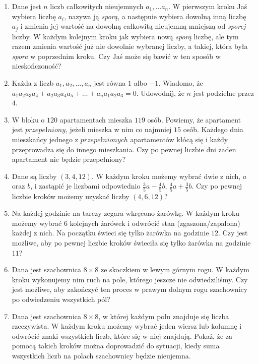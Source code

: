 \documentclass{article}
\begin{document}
\begin{enumerate}[\Roman*.]
\begin{enumerate}[1.]
				\item Dane jest $n$ liczb całkowitych nieujemnych $a_1, \ldots a_n$. W pierwszym kroku Jaś wybiera liczbę $a_i$, nazywa ją \textit{sporą}, a następnie wybiera dowolną inną liczbę $a_j$ i zmienia jej wartość na dowolną całkowitą nieujemną mniejszą od \textit{sporej} liczby. W każdym kolejnym kroku jak wybiera nową \textit{sporą} liczbę, ale tym razem zmienia wartość już nie dowolnie wybranej liczby, a takiej, która była \textit{spora} w poprzednim kroku. Czy Jaś może się bawić w ten sposób w nieskończoność?
					
				\item Każda z liczb $a_1, a_2, \ldots , a_n$ jest równa $1$ albo $-1$. Wiadomo, że $a_1 a_2 a_3 a_4 + a_2 a_3 a_4 a_5 + \ldots + a_n a_1 a_2 a_3 = 0$. Udowodnij, że $n$ jest podzielne przez $4$.
				
				\item W bloku o $120$ apartamentach mieszka $119$ osób. Powiemy, że apartament jest $przepełniony$, jeżeli mieszka w nim co najmniej $15$ osób. Każdego dnia mieszkańcy jednego z $przepełnionych$ apartamentów kłócą się i każdy przeprowadza się do innego mieszkania. Czy po pewnej liczbie dni żaden apartament nie będzie przepełniony?
				
				\item Dane są liczby $(3, 4, 12)$. W każdym kroku możemy wybrać dwie z nich, $a$ oraz $b$, i zastąpić je liczbami odpowiednio $\frac{3}{5}a - \frac{4}{5}b$, $\frac{4}{5}a + \frac{3}{5}b$. Czy po pewnej liczbie kroków możemy uzyskać liczby $(4, 6, 12)$?
					
				\item Na każdej godzinie na tarczy zegara wkręcono żarówkę. W każdym kroku możemy wybrać $6$ kolejnych żarówek i odwrócić stan (zgaszona/zapalona) każdej z nich. Na początku świeci się tylko żarówka na godzinie $12$. Czy jest możliwe, aby po pewnej liczbie kroków świeciła się tylko żarówka na godzinie $11$?
				
				\item Dana jest szachownica $8 \times 8$ ze skoczkiem w lewym górnym rogu. W każdym kroku wykonujemy nim ruch na pole, którego jeszcze nie odwiedziliśmy. Czy jest możliwe, aby zakończyć ten proces w prawym dolnym rogu szachownicy po odwiedzeniu wszystkich pól?
				
				\item Dana jest szachownica $8 \times 8$, w której każdym polu znajduje się liczba rzeczywista. W każdym kroku możemy wybrać jeden wiersz lub kolumnę i odwrócić znaki wszystkich liczb, które się w niej znajdują. Pokaż, że za pomocą takich kroków można doprowadzić do sytuacji, kiedy suma wszystkich liczb na polach szachownicy będzie nieujemna.
				

\end{enumerate}
\end{enumerate}
\end{document}

